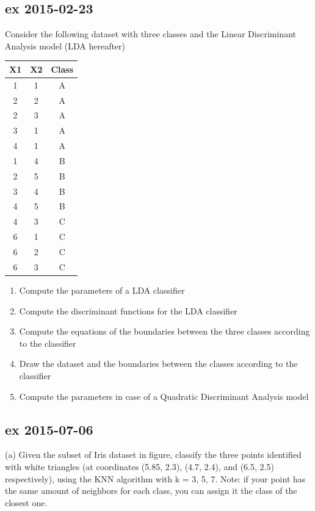\documentclass[a4paper,12pt,titlepage]{article} %
\begin{document}
\subsection{ex 2015-02-23}
Consider the following dataset with three classes and the Linear Discriminant Analysis
model (LDA hereafter)
\begin{center}
  \begin{tabular}{cc|c}
    X1 & X2  & Class \\
    \hline
    \hline
    1 & 1 & A \\
    2 & 2 & A \\
    2 & 3 & A \\
    3 & 1 & A \\
    4 & 1 & A \\
    \hline
    1 & 4 & B \\
    2 & 5 & B \\
    3 & 4 & B \\
    4 & 5 & B \\
    \hline
    4 & 3 & C \\
    6 & 1 & C \\
    6 & 2 & C \\
    6 & 3 & C \\
    \hline
  \end{tabular}
\end{center}

\begin{enumerate}
\item Compute the parameters of a LDA classifier
\item Compute the discriminant functions for the LDA classifier
\item Compute the equations of the boundaries between the three classes according to
the classifier
\item Draw the dataset and the boundaries between the classes according to the classifier
\item Compute the parameters in case of a Quadratic Discriminant Analysis model
\end{enumerate}

\subsection{ex 2015-07-06}
(a) Given the subset of Iris dataset in figure, classify the three points identified with white triangles (at coordinates (5.85, 2.3), (4.7, 2.4), and (6.5, 2.5) respectively), using the KNN algorithm with k = 3, 5, 7. Note: if your point has the same amount of neighbors for each class, you can assign it the class of the closest one.\\
\end{document}
